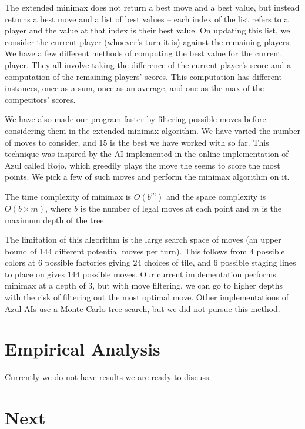 \documentclass[12pt]{article}
\begin{document}
The extended minimax does not return a best move and a best value, but instead returns a best move and a list of best 
values -- each index of the list refers to a player and the value at that index is their best value.
On updating this list, we consider the current player (whoever's turn it is) against
the remaining players. We have a few different methods of computing the best value for
the current player. They all involve taking the difference of the current player's score and a computation of the remaining players' scores. 
This computation has different instances, once as a sum, once as an average, and one as the max of the competitors' scores.

We have also made our program faster by filtering possible moves before considering them in the extended minimax algorithm. We have varied the number of moves to consider, and 15
is the best we have worked with so far. This technique was inspired by the AI implemented in the online implementation of Azul called Rojo, which greedily plays the move the seems to score the most points. We pick a few of such moves and perform the minimax algorithm on it.

The time complexity of minimax is $O(b^m)$ and the space complexity is $O(b\times m)$, where $b$ is the number of
legal moves at each point and $m$ is the maximum depth of the tree.

The limitation of this algorithm is the large search space of moves
(an upper bound of 144 different potential moves per turn).
This follows from $4$ possible colors at $6$ possible factories giving $24$ choices of tile, and $6$ possible staging lines to place on gives $144$ possible moves.
Our current implementation performs minimax at a depth of 3,
but with move filtering, we can go to higher depths with the risk of filtering out the most optimal move.
Other implementations of Azul AIs use a Monte-Carlo tree search, but we did not pursue this method.

\section{Empirical Analysis}

%

Currently we do not have results we are ready to discuss.

\section{Next}
\end{document}

